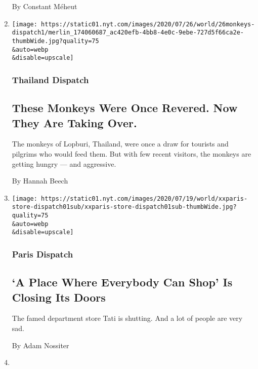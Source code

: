 \begin{enumerate}
  By Constant Méheut
\item
  \href{/2020/07/25/world/asia/thailand-monkeys.html}{}

  \texttt{[image: https://static01.nyt.com/images/2020/07/26/world/26monkeys-dispatch1/merlin\_174060687\_ac420efb-4bb8-4e0c-9ebe-727d5f66ca2e-thumbWide.jpg?quality=75\\\&auto=webp\\\&disable=upscale]}

  \hypertarget{thailand-dispatch}{%
  \subsubsection{Thailand Dispatch}\label{thailand-dispatch}}

  \hypertarget{these-monkeys-were-once-revered-now-they-are-taking-over}{%
  \subsection{These Monkeys Were Once Revered. Now They Are Taking
  Over.}\label{these-monkeys-were-once-revered-now-they-are-taking-over}}

  The monkeys of Lopburi, Thailand, were once a draw for tourists and
  pilgrims who would feed them. But with few recent visitors, the
  monkeys are getting hungry --- and aggressive.

  By Hannah Beech
\item
  \href{/2020/07/20/world/europe/france-paris-tati-coronavirus.html}{}

  \texttt{[image: https://static01.nyt.com/images/2020/07/19/world/xxparis-store-dispatch01sub/xxparis-store-dispatch01sub-thumbWide.jpg?quality=75\\\&auto=webp\\\&disable=upscale]}

  \hypertarget{paris-dispatch}{%
  \subsubsection{Paris Dispatch}\label{paris-dispatch}}

  \hypertarget{a-place-where-everybody-can-shop-is-closing-its-doors}{%
  \subsection{`A Place Where Everybody Can Shop' Is Closing Its
  Doors}\label{a-place-where-everybody-can-shop-is-closing-its-doors}}

  The famed department store Tati is shutting. And a lot of people are
  very sad.

  By Adam Nossiter
\item
  \href{/2020/07/18/world/middleeast/iraq-coronovirus-cemetery.html}{}


\end{enumerate}
